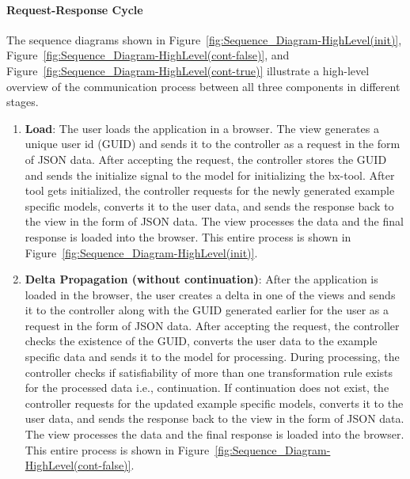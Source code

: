 \paragraph{Request-Response Cycle} 
The sequence diagrams shown in Figure~\ref{fig:Sequence_Diagram-HighLevel(init)}, Figure~\ref{fig:Sequence_Diagram-HighLevel(cont-false)}, and Figure~\ref{fig:Sequence_Diagram-HighLevel(cont-true)} illustrate a high-level overview of the communication process between all three components in different stages.
\begin{enumerate}
	\item {\textbf{Load}: The user loads the application in a browser. The view generates a unique user id (GUID) and sends it to the controller as a request in the form of JSON data. After accepting the request, the controller stores the GUID and sends the initialize signal to the model for initializing the bx-tool. After tool gets initialized, the controller requests for the newly generated example specific models, converts it to the user data, and sends the response back to the view in the form of JSON data. The view processes the data and the final response is loaded into the browser. This entire process is shown in Figure~\ref{fig:Sequence_Diagram-HighLevel(init)}.}
	
	\item {\textbf{Delta Propagation (without continuation)}: After the application is loaded in the browser, the user creates a delta in one of the views and sends it to the controller along with the GUID generated earlier for the user as a request in the form of JSON data. After accepting the request, the controller checks the existence of the GUID, converts the user data to the example specific data and sends it to the model for processing. During processing, the controller checks if satisfiability of more than one transformation rule exists for the processed data i.e., continuation. If continuation does not exist, the controller requests for the updated example specific models, converts it to the user data, and sends the response back to the view in the form of JSON data. The view processes the data and the final response is loaded into the browser. This entire process is shown in Figure~\ref{fig:Sequence_Diagram-HighLevel(cont-false)}.}
	

\end{enumerate}
